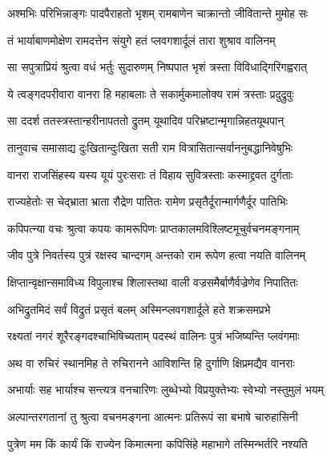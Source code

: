 \twolineshloka
{अश्मभिः परिभिन्नाङ्गः पादपैराहतो भृशम्}
{रामबाणेन चाक्रान्तो जीवितान्ते मुमोह सः} %

\twolineshloka
{तं भार्याबाणमोक्षेण रामदत्तेन संयुगे}
{हतं प्लवगशार्दूलं तारा शुश्राव वालिनम्} %

\twolineshloka
{सा सपुत्राप्रियं श्रुत्वा वधं भर्तुः सुदारुणम्}
{निष्पपात भृशं त्रस्ता विविधाद्गिरिगह्वरात्} %

\twolineshloka
{ये त्वङ्गदपरीवारा वानरा हि महाबलाः}
{ते सकार्मुकमालोक्य रामं त्रस्ताः प्रदुद्रुवुः} %

\twolineshloka
{सा ददर्श ततस्त्रस्तान्हरीनापततो द्रुतम्}
{यूथादिव परिभ्रष्टान्मृगान्निहतयूथपान्} %

\twolineshloka
{तानुवाच समासाद्य दुःखितान्दुःखिता सती}
{राम वित्रासितान्सर्वाननुबद्धानिवेषुभिः} %

\twolineshloka
{वानरा राजसिंहस्य यस्य यूयं पुरःसराः}
{तं विहाय सुवित्रस्ताः कस्माद्द्रवत दुर्गताः} %

\twolineshloka
{राज्यहेतोः स चेद्भ्राता भ्राता रौद्रेण पातितः}
{रामेण प्रसृतैर्दूरान्मार्गणैर्दूर पातिभिः} %

\twolineshloka
{कपिपत्न्या वचः श्रुत्वा कपयः कामरूपिणः}
{प्राप्तकालमविश्लिष्टमूचुर्वचनमङ्गनाम्} %

\twolineshloka
{जीव पुत्रे निवर्तस्य पुत्रं रक्षस्व चान्दगम्}
{अन्तको राम रूपेण हत्वा नयति वालिनम्} %

\twolineshloka
{क्षिप्तान्वृक्षान्समाविध्य विपुलाश्च शिलास्तथा}
{वाली वज्रसमैर्बाणैर्वज्रेणेव निपातितः} %

\twolineshloka
{अभिद्रुतमिदं सर्वं विद्रुतं प्रसृतं बलम्}
{अस्मिन्प्लवगशार्दूले हते शक्रसमप्रभे} %

\twolineshloka
{रक्ष्यतां नगरं शूरैरङ्गदश्चाभिषिच्यताम्}
{पदस्थं वालिनः पुत्रं भजिष्यन्ति प्लवंगमाः} %

\twolineshloka
{अथ वा रुचिरं स्थानमिह ते रुचिरानने}
{आविशन्ति हि दुर्गाणि क्षिप्रमद्यैव वानराः} %

\twolineshloka
{अभार्याः सह भार्याश्च सन्त्यत्र वनचारिणः}
{लुब्धेभ्यो विप्रयुक्तेभ्यः स्वेभ्यो नस्तुमुलं भयम्} %

\twolineshloka
{अल्पान्तरगतानां तु श्रुत्वा वचनमङ्गना}
{आत्मनः प्रतिरूपं सा बभाषे चारुहासिनी} %

\twolineshloka
{पुत्रेण मम किं कार्यं किं राज्येन किमात्मना}
{कपिसिंहे महाभागे तस्मिन्भर्तरि नश्यति} %

